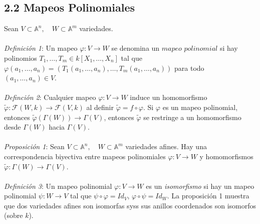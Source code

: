 \documentclass{article}
\newcommand{\A}{\mathbb{A}}
\begin{document}
\subsection*{2.2 Mapeos Polinomiales}
Sean $V \subset \A^n, \quad W \subset \A^m$ variedades.
\\
\\
\textit{Definición 1}: Un mapeo $\varphi  : V \to W$ se denomina un $\textit{mapeo polinomial}$ si hay polinomios $T_1, \dots, T_m \in k[X_1, \dots, X_n]$ tal que $\varphi(a_1, \dots, a_n)=(T_1(a_1,\dots,a_n),\dots,T_m(a_1,\dots,a_n))$ para todo $(a_1,\dots,a_n) \in V$.
\\
\\
\textit{Definción 2}: Cualquier mapeo $\varphi:V \to W$ induce un homomorfismo $\tilde{\varphi}: \mathcal{F}(W,k) \to \mathcal{F}(V,k)$ al definir $\tilde{\varphi}=f \circ \varphi$. Si $\varphi$ es un mapeo polinomial, entonces $\tilde{\varphi}(\Gamma(W)) \to \Gamma(V)$, entonces $\tilde{\varphi}$ se restringe a un homomorfismo desde $\Gamma(W)$ hacia $\Gamma(V)$.
\\
\\
\textit{Proposición 1}: Sean $V \subset \A^n, \quad W \subset \A^m$ variedades afines. Hay una correspondencia biyectiva entre mapeos polinomiales $\varphi:V \to W$ y homomorfismos $\tilde{\varphi}:\Gamma(W) \to \Gamma(V)$. 
\\
\\
\textit{Definición 3}: Un mapeo polinomial $\varphi:V \to W$ es un \textit{isomorfismo} si hay un mapeo polinomial $\psi: W \to V$ tal que $\psi \circ \varphi=Id_{V}$, $\varphi \circ \psi =Id_W$. La proposición 1 muestra que dos variedades afines son isomorfas syss sus anillos coordenados son isomorfos (sobre $k$).
\end{document}
